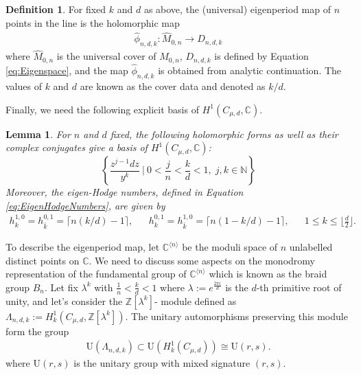 \documentclass[12pt, letterpaper]{amsart}
\theoremstyle{plain}
\newtheorem{lemma}[theorem]{Lemma}
\theoremstyle{definition}
\newtheorem{definition}[theorem]{Definition}
\begin{document}
\begin{definition}
\label{def:EigenPeriod}
For fixed $k$ and $d$ as above, the (universal) eigenperiod map of $n$ points in the line is the holomorphic map 
\begin{align*}
\widehat{\phi}_{n,d,k}:\widehat{M}_{0,n} \longrightarrow D_{n,d,k}
\end{align*}
where $\widehat{M}_{0,n}$ is the universal cover of $M_{0,n}$, $D_{n,d,k}$ is defined by Equation \eqref{eq:Eigenspace}, and the map $\widehat{\phi}_{n,d,k}$ is obtained from analytic continuation. The values of $k$ and $d$ are known as the cover data and denoted as $k/d$. 
\end{definition}
Finally, we need the following explicit basis of $H^1(C_{\mu,d}, \mathbb{C})$.
\begin{lemma}\cite[Chap. 3]{McM13}
For $n$ and $d$ fixed, 
the following holomorphic forms as well as their complex conjugates give a basis of $H^1(C_{\mu,d}, \mathbb{C})$:
\begin{equation}\label{eqnholodiff}
\left\{
\frac{z^{j-1}dz}{y^k} \ \bigg| \  
0 <\frac{j}{n}<\frac{k}{d} < 1, \;
j,k \in \mathbb{N}
\right\}
\end{equation}
Moreover, the eigen-Hodge numbers, defined in Equation \ref{eq:EigenHodgeNumbers}, are given by 
 \begin{align*}
    h^{1,0}_{k}=h^{0,1}_{\bar{k}}=\lceil n(k/d)-1 \rceil, 
   && h^{0,1}_{k}=h^{1,0}_{\bar{k}}=\lceil n(1-k/d)-1 \rceil, 
   &&
 1\leq k\leq \bigg\lfloor \frac{d}{2}\bigg\rfloor .   
\end{align*}
\end{lemma}
To describe the eigenperiod map, let $\mathbb{C}^{ \langle n \rangle}$ be the moduli space of $n$ unlabelled distinct points on $\mathbb{C}$. We need to discuss some aspects on the monodromy representation of the fundamental group of $\mathbb{C}^{ \langle n \rangle}$ which is known as the braid group $B_n$. Let fix $\lambda^{k}$ with $\frac{1}{n} < \frac{k}{d} < 1$
where $\lambda := e^{\frac{2 \pi i}{d}}$ is the $d$-th primitive root of unity,
and let's consider the $\mathbb{Z}[\lambda^k]$- module defined as
$
\Lambda_{n,d,k}:= H^1_k(C_{\mu, d}, \mathbb{Z}[\lambda^k]) .
$
The unitary automorphisms preserving this module form the group
\begin{align}
\mathrm{U}(\Lambda_{n,d,k}) \subset  \mathrm{U}\left( H^1_k(C_{\mu, d}) 
\right) \cong \mathrm{U}(r,s).    
\end{align}
where $\mathrm{U}(r,s)$ is the unitary group with mixed signature $(r,s)$.
\end{document}
